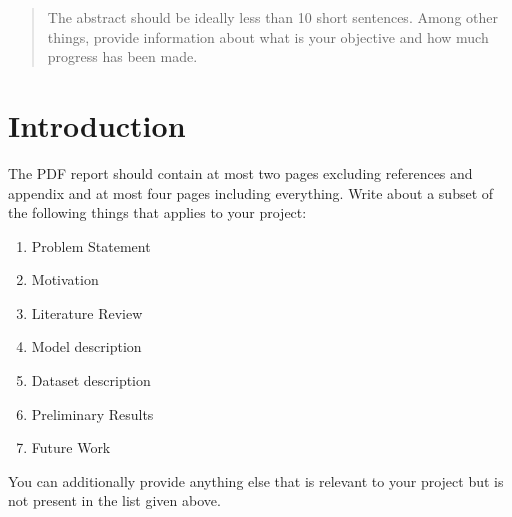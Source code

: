 \documentclass{article}
\begin{document}

\printAffiliationsAndNotice{}

\begin{abstract}
The abstract should be ideally less than 10 short sentences. Among other things, provide information about what is your objective and how much progress has been made. 
\end{abstract}

\section{Introduction}
\label{introduction}
The PDF report should contain at most two pages excluding references and appendix and at most four pages including everything. Write about a subset of the following things that applies to your project:

\begin{enumerate}
	\item Problem Statement
	\item Motivation
	\item Literature Review
	\item Model description
	\item Dataset description
	\item Preliminary Results
	\item Future Work
\end{enumerate}

You can additionally provide anything else that is relevant to your project but is not present in the list given above. 
\end{document}
